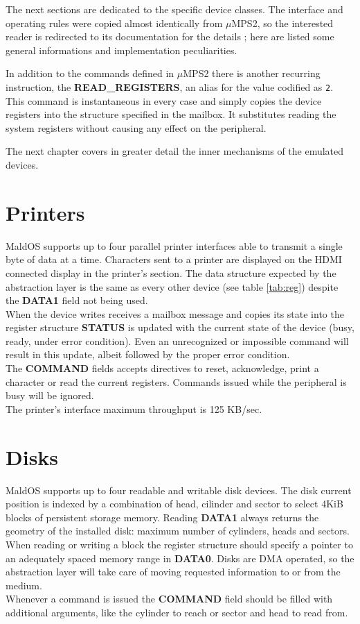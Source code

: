 \documentclass[12pt,a4paper,openright,twoside]{report}
\begin{document}
The next sections are dedicated to the specific device classes. The interface and
operating rules were copied almost identically from $\mu$MPS2, so the interested
reader is redirected to its documentation for the details \cite{pop}; here are listed
some general informations and implementation peculiarities.

In addition to the commands defined in $\mu$MPS2 there is another recurring instruction,
the \textbf{READ\_REGISTERS}, an alias for the value codified as {\tt 2}. This
command is instantaneous in every case and simply copies the device registers into
the structure specified in the mailbox. It substitutes reading the system registers
without causing any effect on the peripheral.

The next chapter covers in greater detail the inner mechanisms of the emulated 
devices.

\section{Printers}
MaldOS supports up to four parallel printer interfaces able to transmit a 
single byte of data at a time. Characters sent to a printer are displayed on 
the HDMI connected display in the printer's section.
The data structure expected by the abstraction layer is the same as every other
device (see table \ref{tab:reg}) despite the \textbf{DATA1} field not being used.\\
When the device writes receives a mailbox message and copies its state into the
register structure \textbf{STATUS} is updated with the current state of the device
(busy, ready, under error condition). Even an unrecognized or impossible command will
 result in this update, albeit followed by the proper error condition.\\
The \textbf{COMMAND} fields accepts directives to reset, acknowledge, print a
character or read the current registers. Commands issued while the peripheral
is busy will be ignored.\\
The printer's interface maximum throughput is 125 KB/sec.

\section{Disks}
MaldOS supports up to four readable and writable disk devices. The disk current
position is indexed by a combination of head, cilinder and sector to select
4KiB blocks of persistent storage memory.
Reading \textbf{DATA1} always returns the geometry of the installed disk: maximum
number of cylinders, heads and sectors.\\
When reading or writing a block the register structure should specify a pointer
to an adequately spaced memory range in \textbf{DATA0}. Disks are DMA operated, so the abstraction
layer will take care of moving requested information to or from the medium.\\
Whenever a command is issued the \textbf{COMMAND} field should be filled with
additional arguments, like the cylinder to reach or sector and head to read from.
\end{document}
